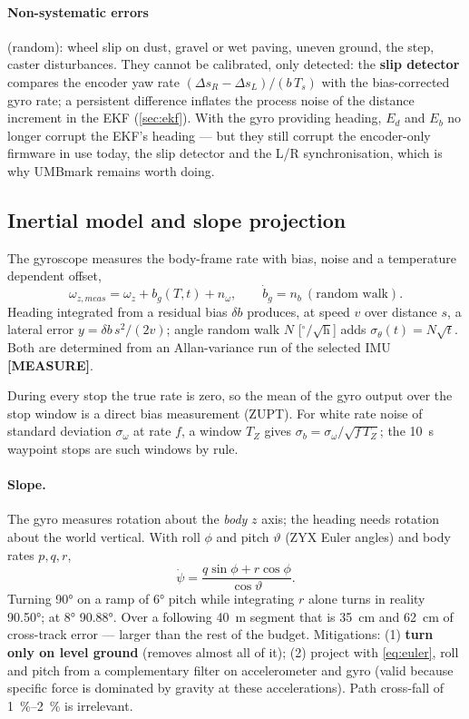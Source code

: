 \documentclass[11pt,a4paper]{article}
\newcommand{\mk}[2]{\textsf{\scriptsize\bfseries\colorbox{#1bg}{\color{#1}[#2]}}}
\newcommand{\MEASURE}{\mk{warn}{MEASURE}}
\begin{document}
\paragraph{Non-systematic errors} (random): wheel slip on dust, gravel or wet
paving, uneven ground, the step, caster disturbances. They cannot be calibrated,
only detected: the \textbf{slip detector} compares the encoder yaw rate
$(\Delta s_R-\Delta s_L)/(b\,T_s)$ with the bias-corrected gyro rate; a
persistent difference inflates the process noise of the distance increment in the
EKF (\cref{sec:ekf}). With the gyro providing heading, $E_d$ and $E_b$ no longer
corrupt the EKF's heading --- but they still corrupt the encoder-only firmware in
use today, the slip detector and the L/R synchronisation, which is why UMBmark
remains worth doing.

\subsection{Inertial model and slope projection}\label{sec:imumodel}

The gyroscope measures the body-frame rate with bias, noise and a temperature
dependent offset,
\begin{equation}
\omega_{z,meas}=\omega_z+b_g(T,t)+n_\omega,\qquad
\dot b_g = n_b\ (\text{random walk}).
\end{equation}
Heading integrated from a residual bias $\delta b$ produces, at speed $v$ over
distance $s$, a lateral error $y=\delta b\,s^2/(2v)$; angle random walk
$N$ [$^\circ/\sqrt{\mathrm{h}}$] adds $\sigma_\theta(t)=N\sqrt t$. Both are
determined from an Allan-variance run of the selected IMU \MEASURE.

During every stop the true rate is zero, so the mean of the gyro output over the
stop window is a direct bias measurement (ZUPT). For white rate noise of standard
deviation $\sigma_\omega$ at rate $f$, a window $T_Z$ gives
$\sigma_{b}=\sigma_\omega/\sqrt{f\,T_Z}$; the \qty{10}{s} waypoint stops are such
windows by rule.

\paragraph{Slope.} The gyro measures rotation about the \emph{body} $z$ axis; the
heading needs rotation about the world vertical. With roll $\phi$ and pitch
$\vartheta$ (ZYX Euler angles) and body rates $p,q,r$,
\begin{equation}
\dot\psi=\frac{q\sin\phi+r\cos\phi}{\cos\vartheta}.\label{eq:euler}
\end{equation}
Turning \ang{90} on a ramp of \ang{6} pitch while integrating $r$ alone turns
in reality \ang{90.50}; at \ang{8} \ang{90.88}. Over a following \qty{40}{m}
segment that is \qty{35}{cm} and \qty{62}{cm} of cross-track error --- larger
than the rest of the budget. Mitigations: (1) \textbf{turn only on level ground}
(removes almost all of it); (2) project with \cref{eq:euler}, roll and pitch from
a complementary filter on accelerometer and gyro (valid because specific force
is dominated by gravity at these accelerations). Path cross-fall of
\qtyrange{1}{2}{\percent} is irrelevant.
\end{document}
